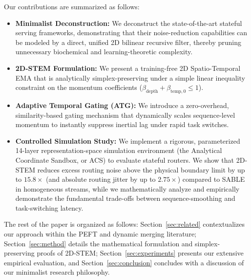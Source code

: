 Our contributions are summarized as follows:
\begin{itemize}
    \item \textbf{Minimalist Deconstruction:} We deconstruct the state-of-the-art stateful serving frameworks, demonstrating that their noise-reduction capabilities can be modeled by a direct, unified 2D bilinear recursive filter, thereby pruning unnecessary biochemical and learning-theoretic complexity.
    \item \textbf{2D-STEM Formulation:} We present a training-free 2D Spatio-Temporal EMA that is analytically simplex-preserving under a simple linear inequality constraint on the momentum coefficients ($\beta_{\text{depth}} + \beta_{\text{temp}, 0} \le 1$).
    \item \textbf{Adaptive Temporal Gating (ATG):} We introduce a zero-overhead, similarity-based gating mechanism that dynamically scales sequence-level momentum to instantly suppress inertial lag under rapid task switches.
    \item \textbf{Controlled Simulation Study:} We implement a rigorous, parameterized 14-layer representation-space simulation environment (the Analytical Coordinate Sandbox, or ACS) to evaluate stateful routers. We show that 2D-STEM reduces excess routing noise above the physical boundary limit by up to $15.8\times$ (and absolute routing jitter by up to $2.75\times$) compared to SABLE in homogeneous streams, while we mathematically analyze and empirically demonstrate the fundamental trade-offs between sequence-smoothing and task-switching latency.
\end{itemize}

The rest of the paper is organized as follows: Section~\ref{sec:related} contextualizes our approach within the PEFT and dynamic merging literature; Section~\ref{sec:method} details the mathematical formulation and simplex-preserving proofs of 2D-STEM; Section~\ref{sec:experiments} presents our extensive empirical evaluation, and Section~\ref{sec:conclusion} concludes with a discussion of our minimalist research philosophy.
